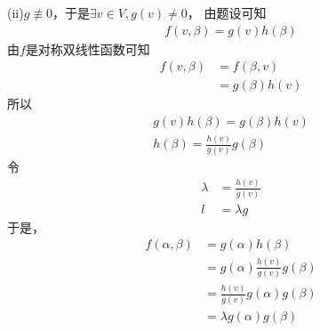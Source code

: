\documentclass{article}
\begin{document}
(ii)$g \not \equiv 0$，于是$\exists v \in V, g(v) \neq 0$，
由题设可知
\begin{align*}
  f(v, \beta) = g(v) h(\beta)
\end{align*}
由$f$是对称双线性函数可知
\begin{align*}
  f(v, \beta) & = f(\beta, v)   \\
              & = g(\beta) h(v)
\end{align*}
所以
\begin{align*}
  g(v) h(\beta) = g(\beta) h(v) \\
  h(\beta) = \frac{h(v)}{g(v)} g(\beta)
\end{align*}
令
\begin{align*}
  \lambda & = \frac{h(v)}{g(v)} \\
  l       & = \lambda g
\end{align*}
于是，
\begin{align*}
  f(\alpha, \beta)
   & = g(\alpha) h(\beta)                   \\
   & = g(\alpha) \frac{h(v)}{g(v)} g(\beta) \\
   & = \frac{h(v)}{g(v)} g(\alpha) g(\beta) \\
   & = \lambda g(\alpha) g(\beta)
\end{align*}
\end{document}
